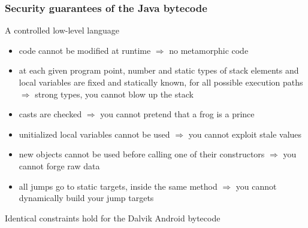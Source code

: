 \documentclass[11pt]{beamer}  %
\begin{document}
\begin{frame}
\frametitle{Security guarantees of the Java bytecode}

\begin{greenbox}{A controlled low-level language}
\begin{itemize}
\item code cannot be modified at runtime $\Rightarrow$ \alert{no metamorphic code}
\item at each given program point,
      number and static types of stack elements and local variables are fixed
      and statically known,
      for all possible execution paths $\Rightarrow$
      \alert{strong types, you cannot blow up the stack}
\item casts are checked $\Rightarrow$ \alert{you cannot pretend that a frog is a prince}
\item unitialized local variables cannot be used $\Rightarrow$
      \alert{you cannot exploit stale values}
\item new objects cannot be used before calling one of their constructors
      $\Rightarrow$ \alert{you cannot forge raw data}
\item all jumps go to static targets, inside the same method
      $\Rightarrow$ \alert{you cannot dynamically build your jump targets}
\end{itemize}
\end{greenbox}

\begin{center}
Identical constraints hold for the Dalvik Android bytecode
\end{center}

\end{frame}
\end{document}
